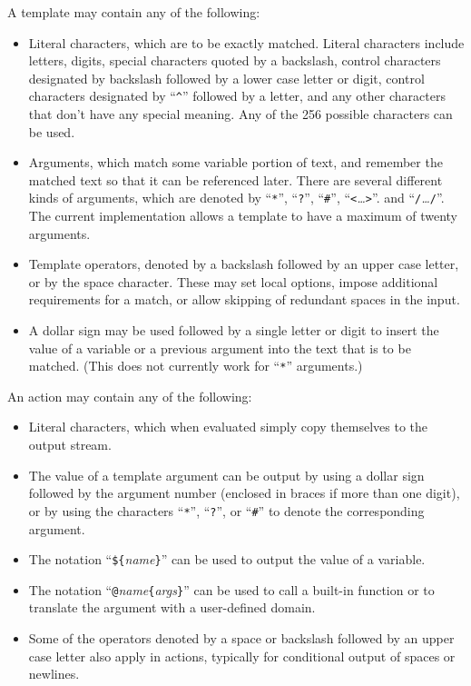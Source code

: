 A template may contain any of the following:
\begin{itemize}
\item Literal characters, which are to be exactly matched.
Literal characters include letters, digits, special characters quoted by
a backslash, control characters designated by backslash followed by
a lower case letter or digit, control characters designated by
``\verb/^/'' followed by a letter, and any other characters that don't have
any special meaning.  Any of the 256 possible characters can be used.
\item Arguments, which match some variable portion of text, and remember
the matched text so that it can be referenced later.
There are several different kinds of arguments, which are denoted by
``\verb/*/'', ``\verb/?/'', ``\verb/#/'', ``{\tt <}{\em \ldots}{\tt >}''.
and ``{\tt /}{\em \ldots}{\tt /}''.
The current implementation allows a template to have a maximum of twenty
arguments.
\item Template operators, denoted by a backslash followed by an upper
case letter, or by the space character.  These may set local options,
impose additional
requirements for a match, or allow skipping of redundant spaces in
the input.
\item A dollar sign may be used followed by a single letter or digit to
insert the value of a variable or a previous argument into the text that
is to be matched.  (This does not currently work for ``\verb/*/'' arguments.)
\end{itemize}

An action may contain any of the following:
\begin{itemize}
\item Literal characters, which when evaluated simply copy themselves to
the output stream.
\item The value of a template argument can be output by using a dollar
sign followed by the argument number (enclosed in braces if more than
one digit), or by using the characters ``\verb/*/'', ``\verb/?/'',
or ``\verb/#/'' to denote the corresponding argument.
\item The notation ``\verb/${/{\em name}\verb/}/'' can be used to output
the value of a variable.
\item The notation ``\verb/@/{\em name}\verb/{/{\em args}\verb/}/'' can
be used to call a built-in function or to translate the argument with a
user-defined domain.
\item Some of the operators denoted by a space or backslash followed by an upper
case letter also apply in actions, typically for conditional output of
spaces or newlines.
\end{itemize}
